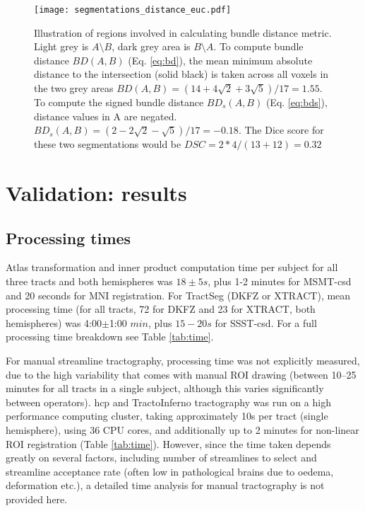 \begin{figure}[htbp!]
  \centering
  \texttt{[image: segmentations\_distance\_euc.pdf]}
  \caption{Illustration of regions involved in calculating bundle distance metric. Light grey is $A\setminus B$, dark grey area is $B\setminus A$. To compute bundle distance $BD(A,B)$ (Eq. \ref{eq:bd}), the mean minimum absolute distance to the intersection (solid black) is taken across all voxels in the two grey areas $BD(A,B) = (14+4\sqrt{2}+3\sqrt{5})/17 = 1.55$. To compute the signed bundle distance $BD_s(A,B)$ (Eq. \ref{eq:bds}), distance values in A are negated. $BD_s(A,B) = (2-2\sqrt{2}-\sqrt{5})/17 = -0.18$. The Dice score for these two segmentations would be $DSC = 2*4/(13+12) = 0.32$}
  \label{fig:BD}
\end{figure}

\section{Validation: results}
\label{sec:validation}

\subsection{Processing times}

Atlas transformation and inner product computation time per subject for all three  tracts and both hemispheres was $18\pm5 s$, plus 1-2 minutes for MSMT-\gls{csd} and 20 seconds for MNI registration.
For TractSeg (DKFZ or XTRACT), mean processing time (for all tracts, 72 for DKFZ and 23 for XTRACT, both hemispheres) was 4:00$\pm$1:00 $min$, plus $15-20 s$ for SSST-\gls{csd}.
For a full processing time breakdown see Table \ref{tab:time}.

For manual streamline tractography, processing time was not explicitly measured, due to the high variability that comes with manual ROI drawing (between 10--25 minutes for all tracts in a single subject, although this varies significantly between operators).
\Gls{hcp} and TractoInferno tractography was run on a high performance computing cluster, taking approximately 10s per tract (single hemisphere), using 36 CPU cores, and additionally up to 2 minutes for non-linear ROI registration (Table \ref{tab:time}).
However, since the time taken depends greatly on several factors, including number of streamlines to select and streamline acceptance rate (often low in pathological brains due to oedema, deformation etc.), a detailed time analysis for manual tractography is not provided here.

